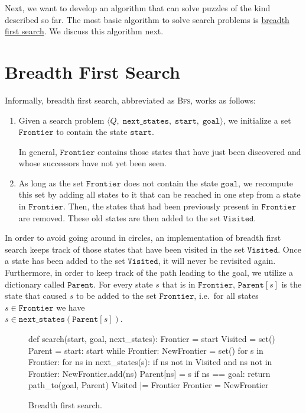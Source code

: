 Next, we want to develop an algorithm that can solve puzzles of the kind described so far.  The most basic
algorithm to solve search problems is \href{https://en.wikipedia.org/wiki/Breadth-first_search}{breadth first search}.
We discuss this algorithm next.

\section{Breadth First Search}
Informally, breadth first search, abbreviated as \textsc{Bfs}, works as follows: 
\begin{enumerate}
\item Given a search problem $\langle Q,\;\mathtt{next\_states},\; \mathtt{start},\; \mathtt{goal}\rangle$,
      we initialize a set $\texttt{Frontier}$ to contain the state $\texttt{start}$.

      In general, $\texttt{Frontier}$ contains those states that have just been discovered and whose successors have not
      yet been seen.
\item As long as the set $\texttt{Frontier}$ does not contain the state $\texttt{goal}$, we recompute this set
      by adding all states to it that can be reached in one step from a state in $\texttt{Frontier}$.
      Then, the states that had been previously present in $\texttt{Frontier}$ are removed.
      These old states are then added to the set $\texttt{Visited}$.
\end{enumerate}
In order to avoid going around in circles, an implementation of breadth first search keeps track of those
states that have been visited in the set $\texttt{Visited}$.  Once a state has been added to
the set $\texttt{Visited}$,  it will never be revisited again.
Furthermore, in order to keep track of the path leading to the goal, we utilize a dictionary called
$\texttt{Parent}$.  For every state $s$ that is in $\texttt{Frontier}$, $\mathtt{Parent}[s]$ is the state that
caused $s$ to be added to the set $\texttt{Frontier}$, i.e.~for all states $s\in\mathtt{Frontier}$ 
we have 
\\[0.2cm]
\hspace*{1.3cm}
$s \in \mathtt{next\_states}(\mathtt{Parent}[s])$.


\begin{figure}[!ht]
\centering
\begin{python3code}
    def search(start, goal, next_states):
        Frontier = { start }
        Visited  = set()
        Parent   = { start: start }
        while Frontier:
            NewFrontier = set()
            for s in Frontier:
                for ns in next_states(s):
                    if ns not in Visited and ns not in Frontier:
                        NewFrontier.add(ns)
                        Parent[ns] = s
                        if ns == goal:
                            return path_to(goal, Parent)
            Visited |= Frontier
            Frontier = NewFrontier
\end{python3code}
\vspace*{-0.3cm}
\caption{Breadth first search.}
\label{fig:Breadth-First-Search.ipynb}
\end{figure}
\vspace*{0.2cm}

